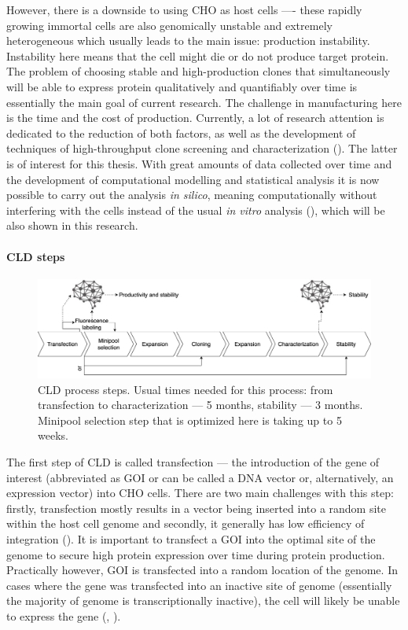 However, there is a downside to using CHO as host cells ---- these rapidly growing immortal cells are also genomically unstable and extremely heterogeneous which usually leads to the main issue: production instability. Instability here means that the cell might die or do not produce target protein. The problem of choosing stable and high-production clones that simultaneously will be able to express protein qualitatively and quantifiably over time is essentially the main goal of current research. The challenge in manufacturing here is the time and the cost of production. Currently, a lot of research attention is dedicated to the reduction of both factors, as well as the development of techniques of high-throughput clone screening and characterization (\cite{Tihanyi_2020}). The latter is of interest for this thesis. With great amounts of data collected over time and the development of computational modelling and statistical analysis it is now possible to carry out the analysis \textit{in silico}, meaning computationally without interfering with the cells instead of the usual \textit{in vitro} analysis (\cite{Christiansen_2018}), which will be also shown in this research.

\paragraph{CLD steps}
\label{section:cld-steps}
\begin{figure}[H]
	\begin{center}
		\includegraphics[width=0.8\linewidth]{bilder/CLD.png}
		\caption[CLD process steps]%
		{CLD process steps. Usual times needed for this process: from transfection to characterization --- 5 months, stability --- 3 months. Minipool selection step that is optimized here is taking up to 5 weeks.}\label{fig:cls-steps}
	\end{center}
\end{figure}

The first step of CLD is called transfection --- the introduction of the gene of interest (abbreviated as GOI or can be called a DNA vector or, alternatively, an expression vector) into CHO cells. There are two main challenges with this step: firstly, transfection mostly results in a vector being inserted into a random site within the host cell genome and secondly, it generally has low efficiency of integration  (\cite{Tihanyi_2020}). It is important to transfect a GOI into the optimal site of the genome to secure high protein expression over time during protein production. Practically however, GOI is transfected into a random location of the genome. In cases where the gene was transfected into an inactive site of genome (essentially the majority of genome is transcriptionally inactive), the cell will likely be unable to express the gene (\cite{Castan_2018}, \cite{Hong_2018}).

